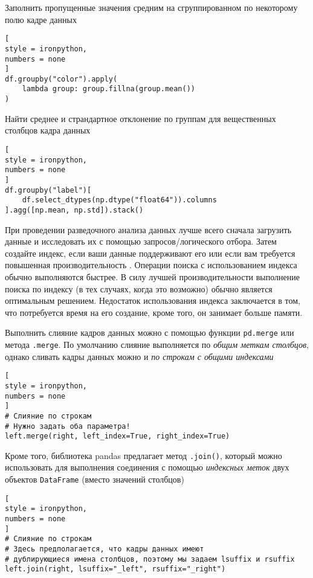 \documentclass[%
	11pt,
	a4paper,
	utf8,
		]{article}
\begin{document}
Заполнить пропущенные значения средним на сгруппированном по некоторому полю кадре данных
\begin{lstlisting}[
style = ironpython,
numbers = none
]
df.groupby("color").apply(
    lambda group: group.fillna(group.mean())
)
\end{lstlisting}

Найти среднее и страндартное отклонение по группам для вещественных столбцов кадра данных
\begin{lstlisting}[
style = ironpython,
numbers = none
]
df.groupby("label")[
    df.select_dtypes(np.dtype("float64")).columns
].agg([np.mean, np.std]).stack()
\end{lstlisting}

При проведении разведочного анализа данных лучше всего сначала загрузить данные и исследовать их с помощью запросов/логического отбора. Затем создайте индекс, если ваши данные поддерживают его или если вам требуется повышенная производительность \cite[]{heydt:pandas-2019}. Операции поиска с использованием индекса обычно выполняются быстрее. В силу лучшей производительности выполнение поиска по индексу (в тех случаях, когда это возможно) обычно является оптимальным решением. Недостаток использования индекса заключается в том, что потребуется время на его создание, кроме того, он занимает больше памяти.

Выполнить слияние кадров данных можно с помощью функции \texttt{pd.merge} или метода \texttt{.merge}. По умолчанию слияние выполняется по \emph{общим меткам столбцов}, однако сливать кадры данных можно и \emph{по строкам с общими индексами} \cite[]{heydt:pandas-2019}
\begin{lstlisting}[
style = ironpython,
numbers = none
]
# Слияние по строкам
# Нужно задать оба параметра!
left.merge(right, left_index=True, right_index=True)
\end{lstlisting}

Кроме того, библиотека pandas предлагает метод \texttt{.join()}, который можно использовать для выполнения соединения с помощью \emph{индексных меток} двух объектов \texttt{DataFrame} (вместо значений столбцов) \cite[]{heydt:pandas-2019}
\begin{lstlisting}[
style = ironpython,
numbers = none
]
# Слияние по строкам
# Здесь предполагается, что кадры данных имеют
# дублирующиеся имена столбцов, поэтому мы задаем lsuffix и rsuffix
left.join(right, lsuffix="_left", rsuffix="_right")
\end{lstlisting}
\end{document}
